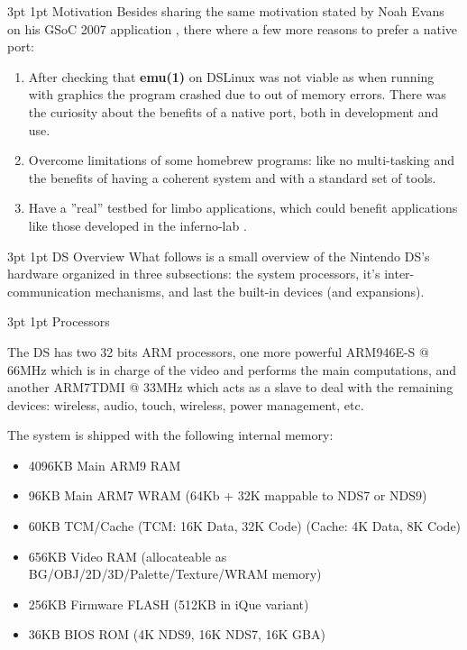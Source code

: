 \documentclass[11pt]{p9article}
\makeatletter
\renewcommand\section{\@startsection {section}{1}{\z@} {3pt} {1pt}
{\normalfont\normalsize\bfseries}}
\renewcommand\subsection{\@startsection {subsection}{1}{\z@} {3pt}
{1pt} {\normalfont\normalsize\bfseries}}
\makeatother
\begin{document}
\subsection{Motivation}
Besides sharing the same motivation stated by Noah Evans on his GSoC 2007 application \cite{gsoc2007},
there where a few more reasons to prefer a native port:
\begin{enumerate}
	\item
	After checking that \textbf{emu(1)} on DSLinux \cite{DSLinux} was not viable
	as when running with graphics the program crashed due to out of memory errors.
	There was the curiosity about the benefits of a native port, both in development and use.
	
	\item
	Overcome limitations of some homebrew programs:
	like no multi-tasking and the benefits of having a coherent system and with a standard set of tools.
	
	\item
	Have a ''real'' testbed for limbo applications,
	which could benefit applications like those developed in the inferno-lab \cite{caerwyn-ipn}.

\end{enumerate}

\section{DS Overview}
What follows is a small overview of the Nintendo DS's hardware
organized in three subsections: the system processors,
it's inter-communication mechanisms, and last the built-in devices (and expansions).

\subsection{Processors}

The DS has two 32 bits ARM \cite{arm7tdmi} processors, one more powerful ARM946E-S @ 66MHz
which is in charge of the video and performs the main computations,
and another ARM7TDMI @ 33MHz which acts as a slave to deal with the remaining devices:
wireless, audio, touch, wireless, power management, etc.

The system is shipped with the following internal memory:

\begin{itemize}
	\item 4096KB	Main ARM9 RAM
	\item 96KB	Main ARM7 WRAM (64Kb + 32K mappable to NDS7 or NDS9)
	\item 60KB	TCM/Cache (TCM: 16K Data, 32K Code) (Cache: 4K Data, 8K Code)
	\item 656KB	Video RAM (allocateable as BG/OBJ/2D/3D/Palette/Texture/WRAM memory)
	\item 256KB	Firmware FLASH (512KB in iQue variant)
	\item 36KB	BIOS ROM (4K NDS9, 16K NDS7, 16K GBA)
\end{itemize}
\end{document}
